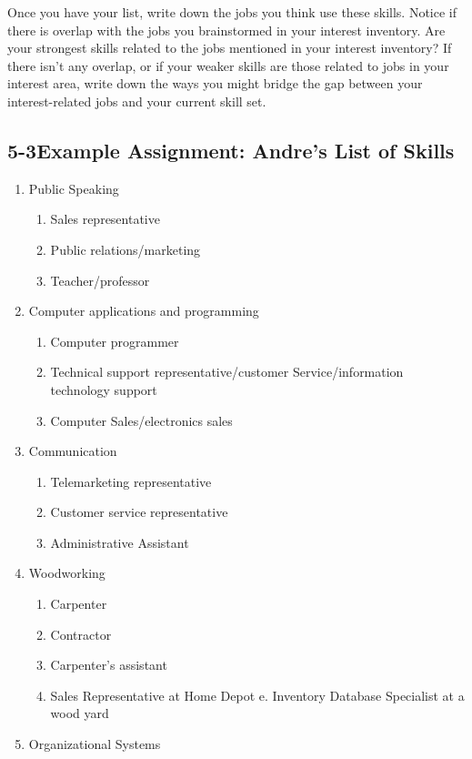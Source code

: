 Once you have your list, write down the jobs you think use these skills. Notice if there is overlap with the jobs you brainstormed in your interest inventory. Are your strongest skills related to the jobs mentioned in your interest inventory? If there isn't any overlap, or if your weaker skills are those related to jobs in your interest area, write down the ways you might bridge the gap between your interest-related jobs and your current skill set.
\pagebreak \subsection*{5-3\quad Example Assignment: Andre's List of Skills}
\begin{enumerate}[leftmargin=*]
\item Public Speaking
\begin{enumerate}
\item Sales representative
\item Public relations/marketing
\item Teacher/professor
\end{enumerate}
\item Computer applications and programming
\begin{enumerate}
\item Computer programmer
\item Technical  support representative/customer Service/information technology support
\item Computer Sales/electronics sales
\end{enumerate}
\item Communication
\begin{enumerate}
\item Telemarketing representative
\item Customer service representative
\item Administrative Assistant
\end{enumerate}
\item Woodworking
\begin{enumerate}
\item Carpenter
\item Contractor
\item Carpenter's assistant
\item Sales Representative at Home Depot e. Inventory Database Specialist at a wood yard
\end{enumerate}
\item Organizational Systems

\end{enumerate}
